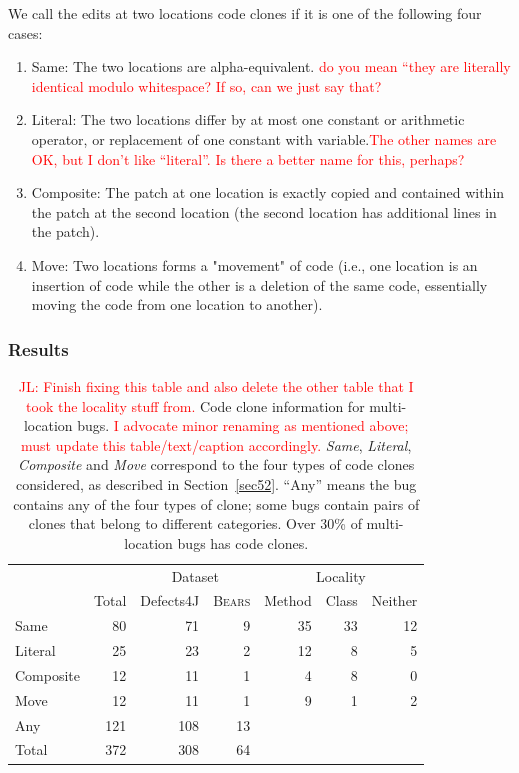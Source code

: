 \documentclass[10pt, conference]{IEEEtran}
\newcommand\todo[1]{\textcolor{red}{#1}}
\newcommand\bears{\textsc{Bears}\xspace}
\begin{document}
We call the edits at two locations code clones if it is one of the following four cases:
\begin{enumerate}
\item Same: The two locations are alpha-equivalent. \todo{do you mean ``they are
    literally identical modulo whitespace?  If so, can we just say that?}
\item Literal: The two locations differ by at most one constant or arithmetic operator,
or replacement of one constant with variable.\todo{The other names are OK, but I
  don't like ``literal''.  Is there a better name for this, perhaps?}
\item Composite: The patch at one location is exactly copied and contained within the patch at 
the 
second location (the second location  has additional lines in the patch).
\item Move: Two locations forms a "movement" of code (i.e., one location is an insertion of 
code 
while the other is a deletion of the same code, essentially moving the code from one location to 
another).
\end{enumerate}

\subsubsection{Results}

\begin{table}
{\begin{center}
\begin{tabular} {lrrrrrr}
\toprule
&&\multicolumn{2}{c}{Dataset} &\multicolumn{3}{c}{Locality}\\
& Total & Defects4J & \bears & Method & Class & Neither\\
\midrule
Same      &  80 &  71 & 9 & 35 & 33 & 12 \\
Literal   &  25 &  23 & 2 & 12 &  8 &  5 \\
Composite &  12 &  11 & 1 &  4 &  8 &  0 \\
Move      &  12 &  11 & 1 &  9 &  1 &  2 \\
\midrule
Any       & 121 & 108 & 13\\
Total     & 372 & 308 & 64\\
\bottomrule
\end{tabular}
\end{center}
}
\caption{\todo{JL: Finish fixing this table and also delete the other table that
    I took the locality stuff from.} Code clone information for multi-location bugs. \todo{I advocate minor
    renaming as mentioned above; must update this table/text/caption accordingly.}
     \emph{Same}, \emph{Literal}, \emph{Composite} and \emph{Move} correspond to the
    four types of code clones considered, as described in Section~\ref{sec52}. ``Any'' means the bug
    contains any of the four types of clone; some bugs contain
    pairs of clones that belong to different categories. 
    Over
    30\% of multi-location bugs has code clones.}
\label{tab:clones}
\end{table}
\end{document}
